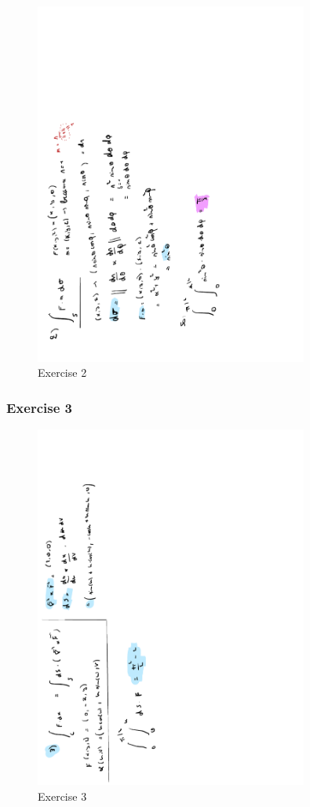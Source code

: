 \documentclass[a4paper]{report}
\begin{document}
\begin{figure}[H]
	\centering
	\includegraphics[angle=-90, width=0.8\textwidth]{assets/wc_7_ex_2.pdf}
	\caption{Exercise 2}
\end{figure}

\subsubsection{Exercise 3}

\begin{figure}[H]
	\centering
	\includegraphics[angle=-90, width=0.8\textwidth]{assets/wc_7_ex_3.pdf}
	\caption{Exercise 3}
\end{figure}
\end{document}
